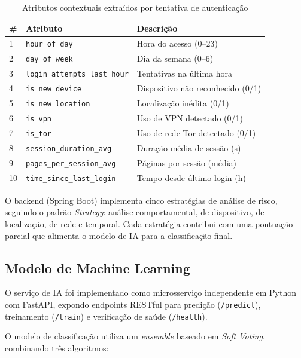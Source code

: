 \documentclass[12pt,a4paper]{article}
\begin{document}
\begin{table}[H]
\centering
\caption{Atributos contextuais extraídos por tentativa de autenticação}
\label{tab:features}
\begin{tabular}{@{}lll@{}}
\toprule
\textbf{\#} & \textbf{Atributo} & \textbf{Descrição} \\
\midrule
1  & \texttt{hour\_of\_day}              & Hora do acesso (0--23) \\
2  & \texttt{day\_of\_week}              & Dia da semana (0--6) \\
3  & \texttt{login\_attempts\_last\_hour} & Tentativas na última hora \\
4  & \texttt{is\_new\_device}            & Dispositivo não reconhecido (0/1) \\
5  & \texttt{is\_new\_location}          & Localização inédita (0/1) \\
6  & \texttt{is\_vpn}                    & Uso de VPN detectado (0/1) \\
7  & \texttt{is\_tor}                    & Uso de rede Tor detectado (0/1) \\
8  & \texttt{session\_duration\_avg}     & Duração média de sessão (s) \\
9  & \texttt{pages\_per\_session\_avg}   & Páginas por sessão (média) \\
10 & \texttt{time\_since\_last\_login}   & Tempo desde último login (h) \\
\bottomrule
\end{tabular}
\end{table}

O backend (Spring Boot) implementa cinco estratégias de análise de risco, seguindo o padrão \textit{Strategy}: análise comportamental, de dispositivo, de localização, de rede e temporal. Cada estratégia contribui com uma pontuação parcial que alimenta o modelo de IA para a classificação final.

\subsection{Modelo de Machine Learning}

O serviço de IA foi implementado como microsserviço independente em Python com FastAPI, expondo endpoints RESTful para predição (\texttt{/predict}), treinamento (\texttt{/train}) e verificação de saúde (\texttt{/health}).

O modelo de classificação utiliza um \textit{ensemble} baseado em \textit{Soft Voting}, combinando três algoritmos:
\end{document}
